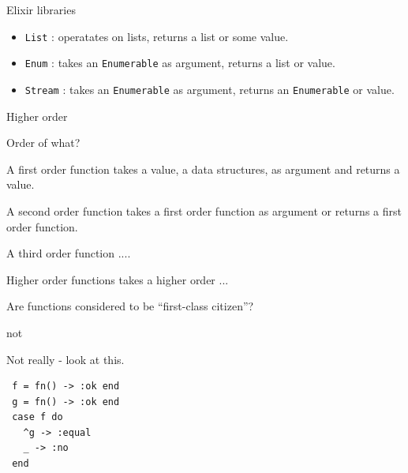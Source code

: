 \begin{frame}{Elixir libraries}

  \begin{itemize}
  \item {\tt List} : operatates on lists, returns a list or some value.  \pause
  \item {\tt Enum} : takes an {\tt Enumerable} as argument, returns a list or value. \pause
  \item {\tt Stream} : takes an {\tt Enumerable} as argument, returns an {\tt Enumerable} or value. 
  \end{itemize}

  \vspace{20pt}
  
\end{frame}


\begin{frame}{Higher order}

Order of what?

\pause\vspace{20pt}
A first order function takes a value, a data structures, as argument and returns a value.

\pause\vspace{20pt}
A second order function takes a first order function as argument or returns a first order function.

\pause\vspace{20pt}
A third order function ....

\pause\vspace{20pt}
Higher order functions takes a higher order ...

\pause\vspace{20pt}
Are functions considered to be ``first-class citizen''?
\end{frame}

\begin{frame}[fragile]{not}
    
  \vspace{20pt}Not really - look at this.
    
\begin{verbatim}
 f = fn() -> :ok end
 g = fn() -> :ok end
 case f do
   ^g -> :equal
   _ -> :no
 end
\end{verbatim}

\end{frame}


